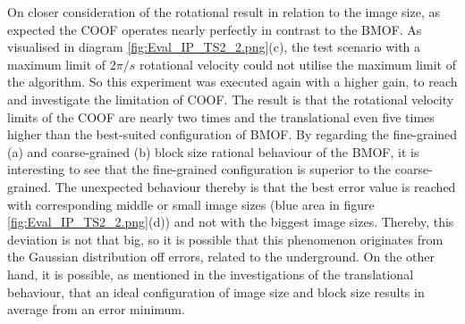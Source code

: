 On closer consideration of the rotational result in relation to the image size, as expected the \gls{COOF} operates nearly perfectly in contrast to the \gls{BMOF}. As visualised in diagram \ref{fig:Eval_IP_TS2_2.png}(c), the test scenario with a maximum limit of \ensuremath{2 \pi / s} rotational velocity could not utilise the maximum limit of the algorithm. So this experiment was executed again with a higher gain, to reach and investigate the limitation of \gls{COOF}. The result is that the rotational velocity limits of the \gls{COOF} are nearly 
two times and the translational even five times higher than the best-suited configuration of \gls{BMOF}.
By regarding the fine-grained (a) and coarse-grained (b) block size rational behaviour of the \gls{BMOF}, it is interesting to see that the 
fine-grained configuration is superior to the coarse-grained. The unexpected behaviour thereby is that the best error value is reached with  corresponding middle or small image sizes (blue area in figure \ref{fig:Eval_IP_TS2_2.png}(d)) and not with the biggest image sizes. Thereby, this deviation is not that big, so it is possible that this phenomenon originates from the Gaussian distribution off errors, related to the underground. On the other hand, it is possible, as mentioned in the investigations of the translational behaviour, that an ideal configuration of image size and block size results in average from an error minimum. 
 

